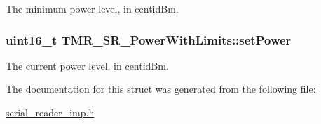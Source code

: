 The minimum power level, in centidBm. \hypertarget{struct_t_m_r___s_r___power_with_limits_2495562c63738830918fd751e3f07234}{
\subsubsection[{setPower}]{\setlength{\rightskip}{0pt plus 5cm}uint16\_\-t {\bf TMR\_\-SR\_\-PowerWithLimits::setPower}}}
\label{struct_t_m_r___s_r___power_with_limits_2495562c63738830918fd751e3f07234}


The current power level, in centidBm. 

The documentation for this struct was generated from the following file:\begin{CompactItemize}
\item 
\hyperlink{serial__reader__imp_8h}{serial\_\-reader\_\-imp.h}\end{CompactItemize}
